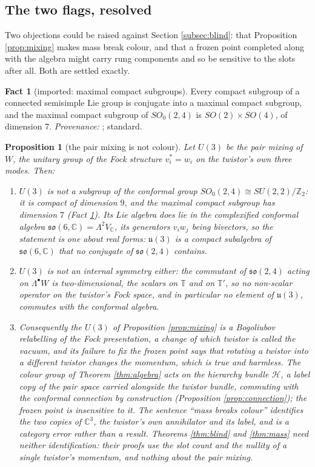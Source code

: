 \documentclass[11pt]{article}
\newtheorem{proposition}[theorem]{Proposition}
\theoremstyle{definition}
\newtheorem{fact}[theorem]{Fact}
\newcommand{\C}{\mathbb{C}}
\newcommand{\T}{\mathbb{T}}
\newcommand{\uu}{\mathfrak{u}}
\newcommand{\so}{\mathfrak{so}}
\begin{document}
\subsection{The two flags, resolved}\label{subsec:flags}

Two objections could be raised against Section \ref{subsec:blind}: that Proposition \ref{prop:mixing} makes mass break colour, and that a frozen point completed along with the algebra might carry rung components and so be sensitive to the slots after all. Both are settled exactly.

\begin{fact}[imported: maximal compact subgroups]\label{fact:compact}
Every compact subgroup of a connected semisimple Lie group is conjugate into a maximal compact subgroup, and the maximal compact subgroup of $SO_{0}(2,4)$ is $SO(2) \times SO(4)$, of dimension $7$. \emph{Provenance:} \cite[Ch.~VI, Thm.~2.1, and Ch.~X]{Helgason1978}; standard.
\end{fact}

\begin{proposition}[the pair mixing is not colour]\label{prop:notcolour}
Let $U(3)$ be the pair mixing of $W$, the unitary group of the Fock structure $v_{i}^{*} = w_{i}$ on the twistor's own three modes. Then:
\begin{enumerate}
\item[(i)] $U(3)$ is not a subgroup of the conformal group $SO_{0}(2,4) \cong SU(2,2)/\mathbb{Z}_{2}$: it is compact of dimension $9$, and the maximal compact subgroup has dimension $7$ (Fact \ref{fact:compact}). Its Lie algebra does lie in the complexified conformal algebra $\so(6, \C) = \Lambda^{2}V_{\C}$, its generators $v_{i}w_{j}$ being bivectors, so the statement is one about real forms: $\uu(3)$ is a compact subalgebra of $\so(6,\C)$ that no conjugate of $\so(2,4)$ contains.
\item[(ii)] $U(3)$ is not an internal symmetry either: the commutant of $\so(2,4)$ acting on $\Lambda^{\bullet}W$ is two-dimensional, the scalars on $\T$ and on $\T'$, so no non-scalar operator on the twistor's Fock space, and in particular no element of $\uu(3)$, commutes with the conformal algebra.
\item[(iii)] Consequently the $U(3)$ of Proposition \ref{prop:mixing} is a Bogoliubov relabelling of the Fock presentation, a change of which twistor is called the vacuum, and its failure to fix the frozen point says that rotating a twistor into a different twistor changes the momentum, which is true and harmless. The colour group of Theorem \ref{thm:algebra} acts on the hierarchy bundle $\mathcal{H}$, a label copy of the pair space carried alongside the twistor bundle, commuting with the conformal connection by construction (Proposition \ref{prop:connection}); the frozen point is insensitive to it. The sentence ``mass breaks colour'' identifies the two copies of $\C^{3}$, the twistor's own annihilator and its label, and is a category error rather than a result. Theorems \ref{thm:blind} and \ref{thm:mass} need neither identification: their proofs use the slot count and the nullity of a single twistor's momentum, and nothing about the pair mixing.
\end{enumerate}
\end{proposition}
\end{document}

